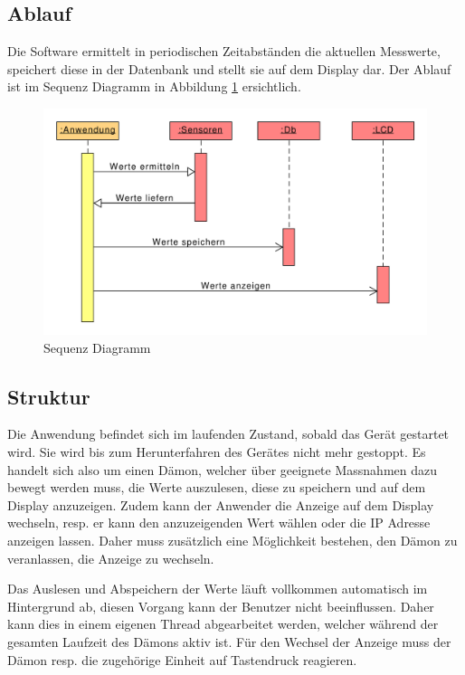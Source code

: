 \documentclass[
    10pt,
    a4paper,
]{scrartcl}
\begin{document}
\subsection{Ablauf}

Die Software ermittelt in periodischen Zeitabständen die aktuellen Messwerte, speichert
diese in der Datenbank und stellt sie auf dem Display dar. Der Ablauf ist im Sequenz
Diagramm in Abbildung \ref{fig:sequence-diagram} ersichtlich.

\begin{figure}[ht]
    \centering
    \includegraphics[width=\textwidth]{sequence-diagram}
    \caption{Sequenz Diagramm}
    \label{fig:sequence-diagram}
\end{figure}

\subsection{Struktur}
Die Anwendung befindet sich im laufenden Zustand, sobald das Gerät gestartet wird. Sie
wird bis zum Herunterfahren des Gerätes nicht mehr gestoppt. Es handelt sich also um einen
Dämon, welcher über geeignete Massnahmen dazu bewegt werden muss, die Werte auszulesen,
diese zu speichern und auf dem Display anzuzeigen. Zudem kann der Anwender die Anzeige auf
dem Display wechseln, resp. er kann den anzuzeigenden Wert wählen oder die IP Adresse
anzeigen lassen. Daher muss zusätzlich eine Möglichkeit bestehen, den Dämon zu
veranlassen, die Anzeige zu wechseln.

Das Auslesen und Abspeichern der Werte läuft vollkommen automatisch im Hintergrund ab,
diesen Vorgang kann der Benutzer nicht beeinflussen. Daher kann dies in einem eigenen
Thread abgearbeitet werden, welcher während der gesamten Laufzeit des Dämons aktiv ist.
Für den Wechsel der Anzeige muss der Dämon resp. die zugehörige Einheit auf Tastendruck
reagieren.
\end{document}
